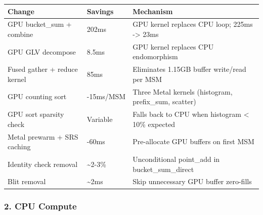 \documentclass[
]{article}
\newcounter{none} %
\begin{document}
{\def\LTcaptype{none} %
\begin{longtable}[]{@{}
  >{\raggedright\arraybackslash}p{}
  >{\raggedleft\arraybackslash}p{}
  >{\raggedright\arraybackslash}p{}@{}}
\toprule\noalign{}
\begin{minipage}[b]{\linewidth}\raggedright
Change
\end{minipage} & \begin{minipage}[b]{\linewidth}\raggedleft
Savings
\end{minipage} & \begin{minipage}[b]{\linewidth}\raggedright
Mechanism
\end{minipage} \\
\midrule\noalign{}
\endhead
\bottomrule\noalign{}
\endlastfoot
GPU bucket\_sum + combine & 202ms & GPU kernel replaces CPU loop; 225ms
-\textgreater{} 23ms \\
GPU GLV decompose & 8.5ms & GPU kernel replaces CPU endomorphism \\
Fused gather + reduce kernel & 85ms & Eliminates 1.15GB buffer
write/read per MSM \\
GPU counting sort & 10-15ms/MSM & Three Metal kernels (histogram,
prefix\_sum, scatter) \\
GPU sort sparsity check & Variable & Falls back to CPU when histogram
\textless{} 10\% expected \\
Metal prewarm + SRS caching & 40-60ms & Pre-allocate GPU buffers on
first MSM \\
Identity check removal & \textasciitilde2-3\% & Unconditional point\_add
in bucket\_sum\_direct \\
Blit removal & \textasciitilde2ms & Skip unnecessary GPU buffer
zero-fills \\
\end{longtable}
}

\subsubsection{2. CPU Compute}\label{cpu-compute}
\end{document}
